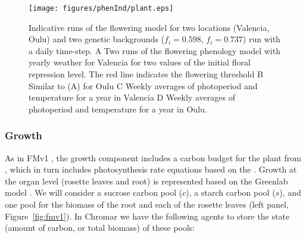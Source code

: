 \begin{figure}[tb]
  \centering
  \texttt{[image: figures/phenInd/plant.eps]}
  \caption{Indicative runs of the flowering model for two locations (Valencia,
    Oulu) and two genetic backgrounds ($f_i=0.598$, $f_i=0.737$) run with a
    daily time-step. A Two runs of the flowering phenology model with yearly
    weather for Valencia for two values of the initial floral repression
    level. The red line indicates the flowering threshold B Similar to (A) for
    Oulu C Weekly averages of photoperiod and temperature for a year in Valencia
    D Weekly averages of photoperiod and temperature for a year in Oulu.}
  \label{fig:vegInd}
\end{figure}


\subsubsection*{Growth}
As in FMv1 \citep{chew_multiscale_2014}, the growth component includes a carbon
budget for the plant from \citet{rasse_leaf_2006}, which in turn includes
photosynthesis rate equations based on the \citet{farquhar_biochemical_1980}
. Growth at the organ level (rosette leaves and root) is represented based on
the Greenlab model \citep{christophe_model-based_2008}. We will consider a
sucrose carbon pool (\(c\)), a starch carbon pool (\(s\)), and one pool for the
biomass of the root and each of the rosette leaves (left panel, Figure~\ref{fig:fmv1}). In
Chromar we have the following agents to store the state (amount of carbon, or
total biomass) of these pools:
